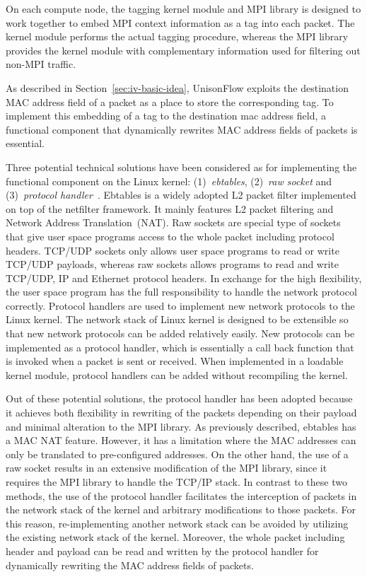 On each compute node, the tagging kernel module and MPI library is designed to
work together to embed MPI context information as a tag into each packet. The
kernel module performs the actual tagging procedure, whereas the MPI library
provides the kernel module with complementary information used for filtering
out non-MPI traffic.

As described in Section~\ref{sec:iv-basic-idea}, UnisonFlow exploits the
destination MAC address field of a packet as a place to store the
corresponding tag. To implement this embedding of a tag to the destination mac
address field, a functional component that dynamically rewrites MAC address
fields of packets is essential.


Three potential technical solutions have been considered as for implementing
the functional component on the Linux kernel: (1)~\emph{ebtables},
(2)~\emph{raw socket} and (3)~\emph{protocol handler}~\autocite{Rosen2013}.
Ebtables is a widely adopted L2 packet filter
implemented on top of the netfilter framework. It mainly features L2 packet
filtering and Network Address Translation~(NAT). Raw sockets are special type
of sockets that give user space programs access to the whole packet including
protocol headers. TCP/UDP sockets only allows user space programs to read or
write TCP/UDP payloads, whereas raw sockets allows programs to read and write
TCP/UDP, IP and Ethernet protocol headers. In exchange for the high
flexibility, the user space program has the full responsibility to handle the
network protocol correctly. Protocol handlers are used to implement new
network protocols to the Linux kernel. The network stack of Linux kernel is
designed to be extensible so that new network protocols can be added
relatively easily. New protocols can be implemented as a protocol handler,
which is essentially a call back function that is invoked when a packet is
sent or received. When implemented in a loadable kernel module, protocol
handlers can be added without recompiling the kernel.

Out of these potential solutions,
the protocol handler has been adopted because it achieves both
flexibility in rewriting of the packets depending on their payload and
minimal alteration to the MPI library. As previously described, ebtables
has a MAC NAT feature. However, it has a limitation where the MAC
addresses can only be translated to pre-configured addresses. On the
other hand, the use of a raw socket results in an extensive modification
of the MPI library, since it requires the MPI library to handle the
TCP/IP stack. In contrast to these two methods, the use of the protocol
handler facilitates the interception of packets in the network stack of
the kernel and arbitrary modifications to those packets. For this reason,
re-implementing another network stack can be avoided by utilizing the existing
network stack of the kernel. Moreover, the whole packet including header and
payload can be read and written by the protocol handler for dynamically
rewriting the MAC address fields of packets.

